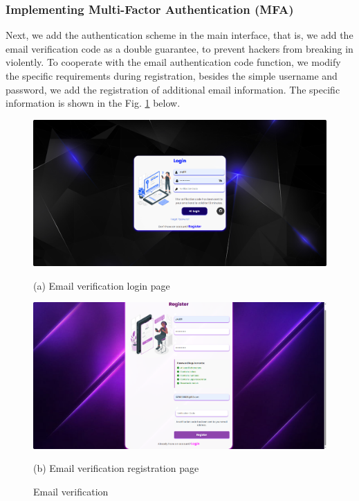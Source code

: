 \documentclass{article}
\begin{document}
\subsubsection{Implementing Multi-Factor Authentication (MFA)}
Next, we add the authentication scheme in the main interface, that is, we add the email verification code as a double guarantee, to prevent hackers from breaking in violently. 
To cooperate with the email authentication code function, we modify the specific requirements during registration, besides the simple username and password, we add the registration of additional email information. 
The specific information is shown in the Fig. \ref{fig:email_verification} below.
\begin{figure}[htb]
    \begin{minipage}{0.5\textwidth}
        \centering
        \includegraphics[width=\textwidth]{images/email_authentication_login_screen.png}
        \caption*{(a) Email verification login page}
    \end{minipage}
    \hfill
    \begin{minipage}{0.5\textwidth}
        \centering
        \includegraphics[width=\textwidth]{images/email_authentication_register_screen.png}
        \caption*{(b) Email verification registration page}
    \end{minipage}
    \caption{Email verification}
    \label{fig:email_verification}
\end{figure}
\end{document}
